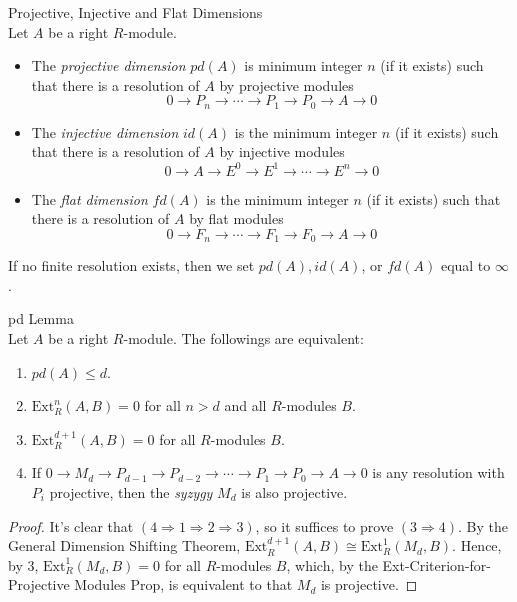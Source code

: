 \begin{definition}{Projective, Injective and Flat Dimensions}\\
Let $A$ be a right $R$-module.
\begin{itemize}
    \item The \textit{projective dimension} $pd(A)$ is minimum integer $n$ (if it exists) such that there is a resolution of $A$ by projective modules
    \[
    0\to P_n\to \cdots\to P_1\to P_0\to A\to0
    \]
    \item The \textit{injective dimension} $id(A)$ is the minimum integer $n$ (if it exists) such that there is a resolution of $A$ by injective modules
    \[
    0\to A\to E^0\to E^1\to \cdots \to E^n\to0
    \]
    \item The \textit{flat dimension} $fd(A)$ is the minimum integer $n$ (if it exists) such that there is a resolution of $A$ by flat modules
    \[
    0\to F_n\to \cdots \to F_1\to F_0\to A\to0
    \]
\end{itemize}
If no finite resolution exists, then we set $pd(A),id(A)$, or $fd(A)$ equal to $\infty$.
\end{definition}

\begin{lemma}{pd Lemma}\\
Let $A$ be a right $R$-module. The followings are equivalent:
\begin{enumerate}
    \item $pd(A) \leq d$.
    \item $\text{Ext}_R^n (A,B)=0$ for all $n>d$ and all $R$-modules $B$.
    \item $\text{Ext}_R^{d+1}(A,B)=0$ for all $R$-modules $B$.
    \item If $0\to M_d\to P_{d-1} \to P_{d-2} \to \cdots \to P_1\to P_0\to A\to 0$ is any resolution with $P_i$ projective, then the \textit{syzygy} $M_d$ is also projective.
\end{enumerate}
\end{lemma}

\begin{proof}
    It's clear that $(4\Rightarrow 1\Rightarrow 2\Rightarrow 3)$, so it suffices to prove $(3\Rightarrow 4)$. By the General Dimension Shifting Theorem, $\text{Ext}_R^{d+1} (A,B)\cong \text{Ext}_R^1 (M_d,B)$. Hence, by 3, $\text{Ext}_R^1 (M_d,B)=0$ for all $R$-modules $B$, which, by the Ext-Criterion-for-Projective Modules Prop, is equivalent to that $M_d$ is projective.
\end{proof}

